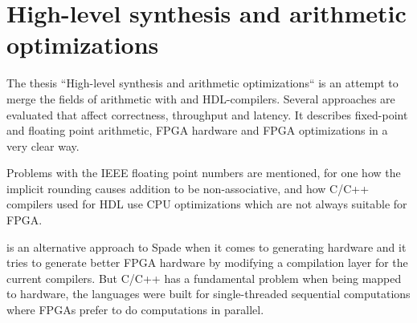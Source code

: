 \cite{src:MinOfFrac}

\section{High-level synthesis and arithmetic optimizations}
The thesis ``High-level synthesis and arithmetic optimizations`` is an attempt to merge the fields of arithmetic with and HDL-compilers. Several approaches are evaluated that affect correctness, throughput and latency. It describes fixed-point and floating point arithmetic, FPGA hardware and FPGA optimizations in a very clear way.

Problems with the IEEE floating point numbers are mentioned, for one how the implicit rounding causes addition to be non-associative, and how C/C++ compilers used for HDL use CPU optimizations which are not always suitable for FPGA.

\citeauthor{src:HLSandOpt} is an alternative approach to Spade when it comes to generating hardware and it tries to generate better FPGA hardware by modifying a compilation layer for the current compilers. But C/C++ has a fundamental problem when being mapped to hardware, the languages were built for single-threaded sequential computations where FPGAs prefer to do computations in parallel.

\cite{src:HLSandOpt}





